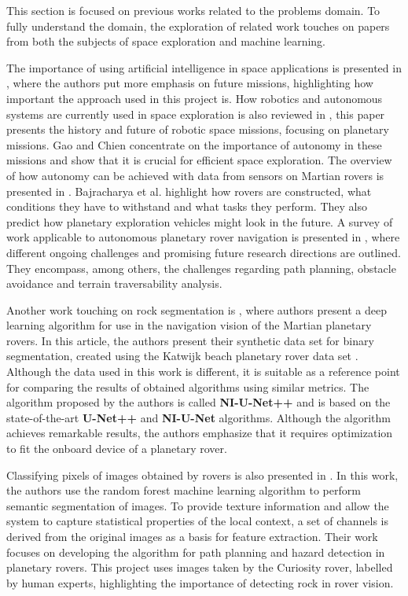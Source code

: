 \documentclass[a4paper,twoside,12pt]{book}
\begin{document}
This section is focused on previous works related to the problems domain. To fully understand the domain, the exploration of related work touches on papers from both the subjects of space exploration and machine learning.

The importance of using artificial intelligence in space applications is presented in \cite{chien2006future}, where the authors put more emphasis on future missions, highlighting how important the approach used in this project is. How robotics and autonomous systems are currently used in space exploration is also reviewed in \cite{gao2017review}, this paper presents the history and future of robotic space missions, focusing on planetary missions. Gao and Chien concentrate on the importance of autonomy in these missions and show that it is crucial for efficient space exploration. The overview of how autonomy can be achieved with data from sensors on Martian rovers is presented in \cite{bajracharya2008autonomy}. Bajracharya et al. highlight how rovers are constructed, what conditions they have to withstand and what tasks they perform. They also predict how planetary exploration vehicles might look in the future.
 A survey of work applicable to autonomous planetary rover navigation is presented in \cite{wong2017adaptive}, where different ongoing challenges and promising future research directions are outlined. They encompass, among others, the challenges regarding path planning, obstacle avoidance and terrain traversability analysis.

Another work touching on rock segmentation is \cite{kuang2021rock}, where authors present a deep learning algorithm for use in the navigation vision of the Martian planetary rovers. In this article, the authors present their synthetic data set for binary segmentation, created using the Katwijk beach planetary rover data set \cite{hewitt2018katwijk}. Although the data used in this work is different, it is suitable as a reference point for comparing the results of obtained algorithms using similar metrics. The algorithm proposed by the authors is called \textbf{NI-U-Net++} and is based on the state-of-the-art \textbf{U-Net++} and \textbf{NI-U-Net} algorithms. Although the algorithm achieves remarkable results, the authors emphasize that it requires optimization to fit the onboard device of a planetary rover.

Classifying pixels of images obtained by rovers is also presented in \cite{ono2015risk}. In this work, the authors use the random forest machine learning algorithm to perform semantic segmentation of images. To provide texture information and allow the system to capture statistical properties of the local context, a set of channels is derived from the original images as a basis for feature extraction. Their work focuses on developing the algorithm for path planning and hazard detection in planetary rovers. This project uses images taken by the Curiosity rover, labelled by human experts, highlighting the importance of detecting rock in rover vision.
\end{document}
